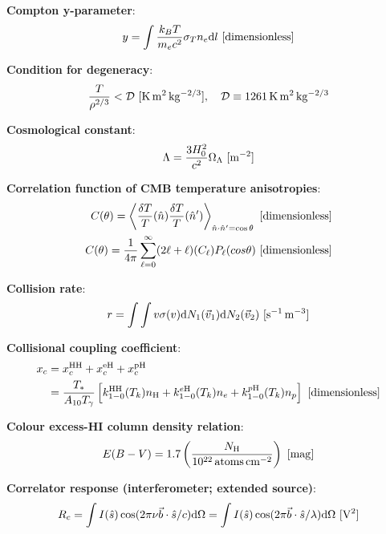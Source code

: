 \documentclass[a4paper,10pt]{article}
\begin{document}
{\noindent}\textbf{Compton y-parameter}:
\begin{align*}
    y = \int\frac{k_BT}{m_ec^2}\sigma_Tn_e\mathrm{d}l ~ [{\rm dimensionless}]
\end{align*}

{\noindent}\textbf{Condition for degeneracy}:
\begin{align*}
    \frac{T}{\rho^{2/3}} < \mathcal{D} ~ [{\rm K\,m^2\,kg^{-2/3}}], ~~~ \mathcal{D} \equiv 1261\,{\rm K\,m^2\,kg^{-2/3}}
\end{align*}

{\noindent}\textbf{Cosmological constant}:
\begin{align*}
    \Lambda = \frac{3H_0^2}{c^2}\Omega_\Lambda ~ [{\rm m^{-2}}]
\end{align*}

{\noindent}\textbf{Correlation function of CMB temperature anisotropies}:
\begin{align*}
    C(\theta) = \left\langle\frac{\delta T}{T}(\hat{n})\frac{\delta T}{T}(\hat{n}')\right\rangle_{\hat{n}\cdot\hat{n}'=\cos\theta}  ~ [{\rm dimensionless}] \\
    C(\theta) = \frac{1}{4\pi} \sum\limits_{\ell=0}^\infty (2\ell+\ell)(C_\ell)P_\ell(cos\theta) ~ [{\rm dimensionless}]
\end{align*}

{\noindent}\textbf{Collision rate}:
\begin{align*}
    r = \int\int v\sigma(v){\rm d}N_1(\vec{v}_1){\rm d}N_2(\vec{v}_2) ~ [{\rm s^{-1}\,m^{-3}}]
\end{align*}

{\noindent}\textbf{Collisional coupling coefficient}:
\begin{align*}
    x_c &= x_c^\mathrm{HH} + x_c^\mathrm{eH} + x_c^\mathrm{pH} \\
        &= \frac{T_*}{A_{10}T_\gamma} \left[k_{1-0}^\mathrm{HH}(T_k)n_\mathrm{H}+k_{1-0}^{e\mathrm{H}}(T_k)n_e+k_{1-0}^{p\mathrm{H}}(T_k)n_p\right] ~ [{\rm dimensionless}]
\end{align*}

{\noindent}\textbf{Colour excess-HI column density relation}:
\begin{align*}
    E(B-V) = 1.7 \left(\frac{N_\mathrm{H}}{10^{22}\,{\rm atoms\,cm^{-2}}}\right) ~ [{\rm mag}]
\end{align*}

{\noindent}\textbf{Correlator response (interferometer; extended source)}:
\begin{align*}
    R_c = \int I(\hat{s})\cos(2\pi\nu\vec{b}\cdot\hat{s}/c){\rm d}\Omega = \int I(\hat{s})\cos(2\pi\vec{b}\cdot\hat{s}/\lambda){\rm d}\Omega ~ [{\rm V^2}]
\end{align*}
\end{document}
